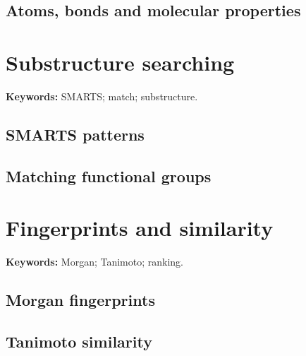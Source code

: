 
\subsection{Atoms, bonds and molecular properties}


\section{Substructure searching}

\begin{methodbox}
\textbf{Keywords:} SMARTS; match; substructure.
\end{methodbox}

\subsection{SMARTS patterns}


\subsection{Matching functional groups}


\section{Fingerprints and similarity}

\begin{methodbox}
\textbf{Keywords:} Morgan; Tanimoto; ranking.
\end{methodbox}

\subsection{Morgan fingerprints}


\subsection{Tanimoto similarity}

